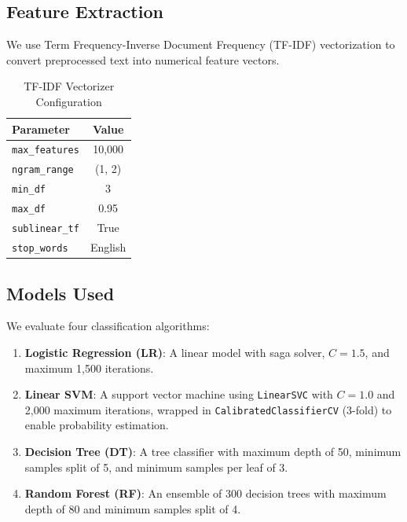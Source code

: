 \documentclass[conference]{IEEEtran}
\begin{document}
\subsection{Feature Extraction}

We use Term Frequency-Inverse Document Frequency (TF-IDF) vectorization to convert preprocessed text into numerical feature vectors.

\begin{table}[ht]
\centering
\caption{TF-IDF Vectorizer Configuration}
\begin{tabular}{lc}
\toprule
Parameter & Value \\
\midrule
\texttt{max\_features} & 10,000 \\
\texttt{ngram\_range} & (1, 2) \\
\texttt{min\_df} & 3 \\
\texttt{max\_df} & 0.95 \\
\texttt{sublinear\_tf} & True \\
\texttt{stop\_words} & English \\
\bottomrule
\end{tabular}
\label{tab:tfidf}
\end{table}

\subsection{Models Used}

We evaluate four classification algorithms:

\begin{enumerate}
    \item \textbf{Logistic Regression (LR)}: A linear model with saga solver, $C = 1.5$, and maximum 1,500 iterations.
    
    \item \textbf{Linear SVM}: A support vector machine using \texttt{LinearSVC} with $C = 1.0$ and 2,000 maximum iterations, wrapped in \texttt{CalibratedClassifierCV} (3-fold) to enable probability estimation.
    
    \item \textbf{Decision Tree (DT)}: A tree classifier with maximum depth of 50, minimum samples split of 5, and minimum samples per leaf of 3.
    
    \item \textbf{Random Forest (RF)}: An ensemble of 300 decision trees with maximum depth of 80 and minimum samples split of 4.
\end{enumerate}
\end{document}
